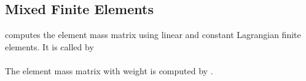 \subsection{Mixed Finite Elements} 

  computes the element mass matrix using linear and constant Lagrangian finite elements. It is called by \\

 \\


 The element mass matrix with weight is computed by .


